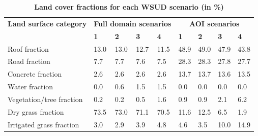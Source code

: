 \documentclass[final,3p,times,authoryear]{elsarticle}
\begin{document}


\begin{table}[!htbp]
\caption{\bf Land cover fractions for each WSUD scenario (in \%) \label{tab:parameters}}     
\begin{tabular}{ l l l l l l l l l}
  \hline  \textbf{Land surface category } &  \multicolumn{4}{|c|}{\textbf{Full domain scenarios}} & \multicolumn{4}{c|}{\textbf{AOI scenarios}}  \\ 
\textbf{} & \textbf{1} & \textbf{2}  & \textbf{3} & \textbf{4}& \textbf{1} & \textbf{2}  & \textbf{3} & \textbf{4}\\ \hline
Roof fraction & 	13.0&	13.0&	12.7&	11.5&	48.9&	49.0&	47.9&	43.8 \\ 
Road fraction & 7.7&	7.7&	7.6&	7.5	&	28.3&	28.3&	27.8&	27.7 \\ 
Concrete fraction & 	2.6&	2.6&	2.6&	2.6	&	13.7&	13.7&	13.6&	13.5 \\ 
Water fraction & 	0.0&	0.6&	1.5&	1.5	&	0.0&	0.0&	0.0&	0.0	 \\ 
Vegetation/tree fraction & 	0.2&	0.2&	0.5&	1.6	&	0.9&	0.9&	2.1&	6.2	 \\ 
Dry grass fraction & 73.5&	73.0&	71.1&	70.5&		11.6&	12.5&	6.5&	1.9	 \\ 
Irrigated grass fraction & 	3.0	&2.9&	3.9&	4.8	&	4.6&	3.5&	10.0&	14.9 \\ 
\hline
\end{tabular}
\end{table}
\end{document}
